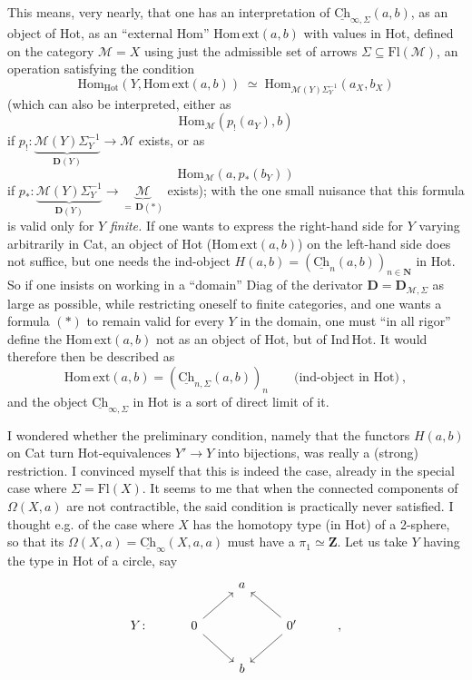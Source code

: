 \documentclass[11pt]{article}
\newcommand{\msp}[1]{\marginpar{\footnotesize [#1]}}
\newcommand{\Ch}{\underline{\mathrm{Ch}}}
\newcommand{\Hot}{\mathrm{Hot}}
\begin{document}
\msp{page 131}
This means, very nearly, that one has an interpretation of $\Ch_{\infty,\Sigma}(a,b)$, as an object of Hot, as an ``external Hom'' $\mathrm{Hom\,ext}(a,b)$ with values in Hot, defined on the category $\mathcal{M}=X$ using just the admissible set of arrows $\Sigma\subseteq\mathrm{Fl}(\mathcal{M})$, an operation satisfying the condition
\[ \boxed{\mathrm{Hom}_{\Hot}(Y,\mathrm{Hom\,ext}(a,b)) \;\simeq\; \mathrm{Hom}_{\mathcal{M}(Y)\Sigma_Y^{-1}}(a_X,b_X)} \tag*{$(*)$} \]
(which can also be interpreted, either as
\[ \mathrm{Hom}_{\mathcal{M}}(p_!(a_Y),b) \]
if $p_! : \underbrace{\mathcal{M}(Y)\Sigma_Y^{-1}}_{\mathbf{D}(Y)} \longrightarrow \mathcal{M}$ exists, or as
\[ \mathrm{Hom}_{\mathcal{M}}(a,p_*(b_Y)) \]
if $p_* : \underbrace{\mathcal{M}(Y)\Sigma_Y^{-1}}_{\mathbf{D}(Y)} \longrightarrow \underbrace{\mathcal{M}}_{=\,\mathbf{D}(*)}$ exists); with the one small nuisance that this formula is valid only for $Y$ \textit{finite.} If one wants to express the right-hand side for $Y$ varying arbitrarily in Cat, an object of Hot ($\mathrm{Hom\,ext}(a,b)$) on the left-hand side does not suffice, but one needs the ind-object $H(a,b) = (\Ch_n(a,b))_{n\in\mathbf{N}}$ in Hot. So if one insists on working in a ``domain'' Diag of the derivator $\mathbf{D}=\mathbf{D}_{\mathcal{M},\Sigma}$ as large as possible, while restricting oneself to finite categories,
\msp{page 132}
and one wants a formula $(*)$ to remain valid for every $Y$ in the domain, one must ``in all rigor'' define the $\mathrm{Hom\,ext}(a,b)$ not as an object of Hot, but of Ind\,Hot. It would therefore then be described as
\[ \mathrm{Hom\,ext}(a,b) = (\Ch_{n,\Sigma}(a,b))_n \qquad \text{(ind-object in Hot)}\ , \]
and the object $\Ch_{\infty,\Sigma}$ in Hot is a sort of direct limit of it.

I wondered whether the preliminary condition, namely that the functors $H(a,b)$ on Cat turn Hot-equivalences $Y'\longrightarrow Y$ into bijections, was really a (strong) restriction. I convinced myself that this is indeed the case, already in the special case where $\Sigma=\mathrm{Fl}(X)$. It seems to me that when the connected components of $\Omega(X,a)$ are not contractible, the said condition is practically never satisfied. I thought e.g. of the case where $X$ has the homotopy type (in Hot) of a 2-sphere, so that its $\Omega(X,a)=\Ch_\infty(X,a,a)$ must have a $\pi_1\simeq\mathbf{Z}$. Let us take $Y$ having the type in Hot of a circle, say
\[
\begin{tikzcd}
 & & a & & \\
Y\colon & 0 \arrow[ur] \arrow[dr] & & 0' \arrow[ul] \arrow[dl] & , \\
 & & b & &
\end{tikzcd}
\]
\end{document}
